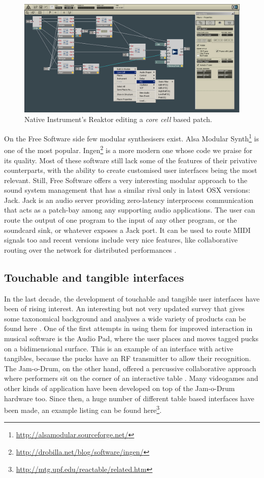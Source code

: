 \begin{figure}[h!]
\centering
\includegraphics[width=.9\textwidth]{pic/reaktor.jpg}
\caption{Native Instrument's Reaktor editing a \emph{core cell} based
  patch.}
\label{fig:reaktor}
\end{figure}

On the Free Software side few modular synthesisers exist. Alsa Modular
Synth\footnote{\url{http://alsamodular.sourceforge.net/}} is one of
the most
popular. Ingen\footnote{\url{http://drobilla.net/blog/software/ingen/}}
is a more modern one whose code we praise for its quality. Most of
these software still lack some of the features of their privative
counterparts, with the ability to create customised user interfaces
being the most relevant. Still, Free Software offers a very
interesting modular approach to the sound system management that has a
similar rival only in latest OSX versions:
Jack\cite{letz09jack2}. Jack is an audio server providing zero-latency
interprocess communication that acts as a patch-bay among any
supporting audio applications. The user can route the output of one
program to the input of any other program, or the soundcard sink, or
whatever exposes a Jack port. It can be used to route MIDI signals too
and recent versions include very nice features, like collaborative
routing over the network for distributed performances \cite{hohn09netjack}.

\subsection{Touchable and tangible interfaces}

In the last decade, the development of touchable and tangible user
interfaces have been of rising interest. An interesting but not very
updated survey that gives some taxonomical background and analyses a
wide variety of products can be found here
\cite{blaine2003contexts}. One of the first attempts in using them for
improved interaction in musical software is the Audio
Pad\cite{patten2002audiopad}, where the user places and moves tagged
pucks on a bidimensional surface. This is an example of an interface
with active tangibles, because the pucks have an RF transmitter to
allow their recognition. The Jam-o-Drum, on the other hand, offered a
percussive collaborative approach where performers sit on the corner
of an interactive table \cite{blaine00jam}. Many videogames and other
kinds of application have been developed on top of the Jam-o-Drum
hardware too. Since then, a huge number of different table based
interfaces have been made, an example listing can be found
here\footnote{\url{http://mtg.upf.edu/reactable/related.htm}}.

